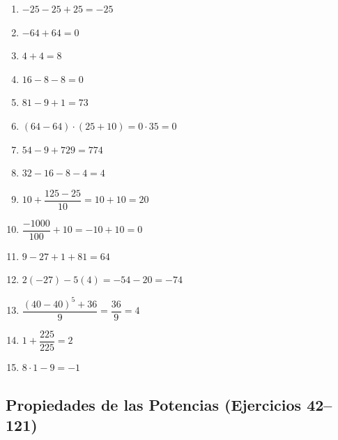 \documentclass[12pt, letterpaper]{article}
\begin{document}
\begin{enumerate}[leftmargin=*, label=\textbf{\arabic*.}]
  \item $-25 - 25 + 25 = -25$
  \item $-64 + 64 = 0$
  \item $4 + 4 = 8$
  \item $16 - 8 - 8 = 0$
  \item $81 - 9 + 1 = 73$
  \item $(64 - 64) \cdot (25 + 10) = 0 \cdot 35 = 0$
  \item $54 - 9 + 729 = 774$
  \item $32 - 16 - 8 - 4 = 4$
  \item $10 + \dfrac{125 - 25}{10} = 10 + 10 = 20$
  \item $\dfrac{-1000}{100} + 10 = -10 + 10 = 0$
  \item $9 - 27 + 1 + 81 = 64$
  \item $2(-27) - 5(4) = -54 - 20 = -74$
  \item $\dfrac{(40 - 40)^5 + 36}{9} = \dfrac{36}{9} = 4$
  \item $1 + \dfrac{225}{225} = 2$
  \item $8 \cdot 1 - 9 = -1$
\end{enumerate}

\subsection*{Propiedades de las Potencias (Ejercicios 42--121)}
\end{document}
